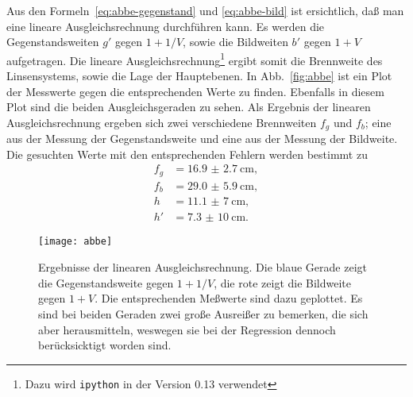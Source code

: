 Aus den Formeln~\eqref{eq:abbe-gegenstand} und \eqref{eq:abbe-bild} ist
ersichtlich, daß man eine lineare Ausgleichsrechnung durchführen
kann. Es werden die Gegenstandsweiten $g'$ gegen $1 + 1/V$, sowie die
Bildweiten $b'$ gegen $1 + V$ aufgetragen. Die lineare
Ausgleichsrechnung\footnote{Dazu wird \texttt{ipython} in der Version
  0.13 verwendet} ergibt somit die Brennweite des Linsensystems, sowie
die Lage der Hauptebenen.  In Abb.~\vref{fig:abbe} ist ein Plot der
Messwerte gegen die entsprechenden Werte zu finden. Ebenfalls in diesem
Plot sind die beiden Ausgleichsgeraden zu sehen.  Als Ergebnis der
linearen Ausgleichsrechnung ergeben sich zwei verschiedene Brennweiten
$f_g$ und $f_b$; eine aus der Messung der Gegenstandsweite und eine aus
der Messung der Bildweite.  Die gesuchten Werte mit den entsprechenden
Fehlern werden bestimmt zu
\begin{align*}
f_g &= \SI{16.9(27)}{\centi\metre}, \\
f_b &= \SI{29.0(59)}{\centi\metre}, \\
h   &= \SI{11.1(70)}{\centi\metre}, \\
h'  &= \SI{7.3(100)}{\centi\metre}.
\end{align*}

\begin{figure}
  \centering
  \texttt{[image: abbe]}
  \caption{Ergebnisse der linearen Ausgleichsrechnung. Die blaue Gerade
    zeigt  die Gegenstandsweite gegen $1 + 1/V$, die rote zeigt die Bildweite gegen $1 + V$.
    Die entsprechenden Meßwerte sind dazu
    geplottet. Es sind bei beiden Geraden zwei große Ausreißer zu
    bemerken, die sich aber herausmitteln, weswegen sie bei der
    Regression dennoch berücksicktigt worden sind.}
  \label{fig:abbe}
\end{figure}